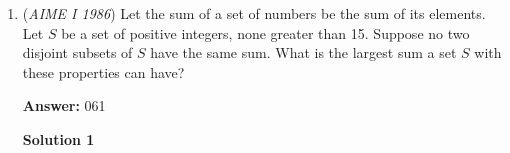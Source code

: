 \begin{enumerate}
 To find the coordinates of $\vec{v}$ under basis $C,$ we compute the product $[ \vec{v} ]_C = P_{B \to C} [\vec{v} ]_B = \begin{bmatrix} \tbinom{0}{0} & -\tbinom{1}{0} & \tbinom{2}{0} & \cdots & -\tbinom{17}{0} \\ 0 & \tbinom{1}{1} & -\tbinom{2}{1} & \cdots & \tbinom{17}{1} \\ 0 & 0 & \tbinom{2}{2} & \cdots & -\tbinom{17}{2} \\ \vdots & \vdots & \vdots & \ddots & \vdots \\ 0 & 0 & 0 & \cdots & \tbinom{17}{17} \end{bmatrix} \begin{bmatrix} 1 \\ -1 \\ 1 \\ \vdots \\ -1 \end{bmatrix} = \begin{bmatrix} \sum_{n=0}^{17} \tbinom{n}{0} \\ -\sum_{n=1}^{17} \tbinom{n}{1} \\  \sum_{n=2}^{17} \tbinom{n}{2} \\ \vdots \\  -\sum_{n=17}^{17} \tbinom{n}{17} \end{bmatrix} = \begin{bmatrix} \tbinom{18}{1} \\ - \tbinom{18}{2} \\ \tbinom{18}{3} \\ \vdots \\ -\tbinom{18}{18} \end{bmatrix},$ where the last equality was obtained via Hockey Stick Identity.

 Thus, our answer is $a_2 =  [ [ \vec{v} ]_C ]_3 = \dbinom{18}{3} = \boxed{816}.$

 -fidgetboss\_4000

 


	\item (\textit{AIME I 1986}) Let the sum of a set of numbers be the sum of its elements. Let $S$ be a set of positive integers, none greater than 15. Suppose no two disjoint subsets of $S$ have the same sum. What is the largest sum a set $S$ with these properties can have?


 
 \textbf{Answer: }061



\textbf{Solution 1}


\end{enumerate}
